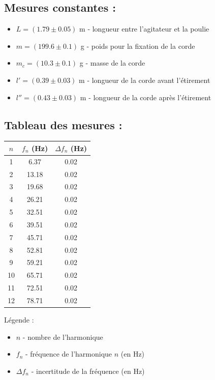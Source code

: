 \documentclass[12pt,a4paper]{article}
\begin{document}
    \subsection{Mesures constantes :}
    \begin{itemize}
        \item $L=(1.79 \pm 0.05)$ m - longueur entre l'agitateur et la poulie
        \item $m=(199.6 \pm 0.1)$ g - poids pour la fixation de la corde
        \item $m_c=(10.3 \pm 0.1)$ g - masse de la corde
        \item $l'=(0.39 \pm 0.03)$ m - longueur de la corde avant l'étirement
        \item $l''=(0.43 \pm 0.03)$ m - longueur de la corde après l'étirement
    \end{itemize}
    \subsection{Tableau des mesures :}

    \begin{minipage}{0.4\textwidth}
        \centering
        \begin{tabular}{c|c|c}
            \toprule
            $n$ & $f_n$ (Hz)  & $\Delta f_n$ (Hz) \\
            \midrule
            1  & 6.37  & 0.02 \\
            2  & 13.18 & 0.02 \\
            3  & 19.68 & 0.02 \\
            4  & 26.21 & 0.02 \\
            5  & 32.51 & 0.02 \\
            6  & 39.51 & 0.02 \\
            7  & 45.71 & 0.02 \\
            8  & 52.81 & 0.02 \\
            9  & 59.21 & 0.02 \\
            10 & 65.71 & 0.02 \\
            11 & 72.51 & 0.02 \\
            12 & 78.71 & 0.02 \\
            \bottomrule
        \end{tabular}
    \end{minipage}%
    \hfill
    \begin{minipage}{0.6\textwidth}
        Légende :
        \begin{itemize}
            \item $n$ - nombre de l'harmonique
            \item $f_n$ - fréquence de l'harmonique $n$ (en Hz)
            \item $\Delta f_n$ - incertitude de la fréquence (en Hz)
        \end{itemize}
    \end{minipage}
\end{document}
